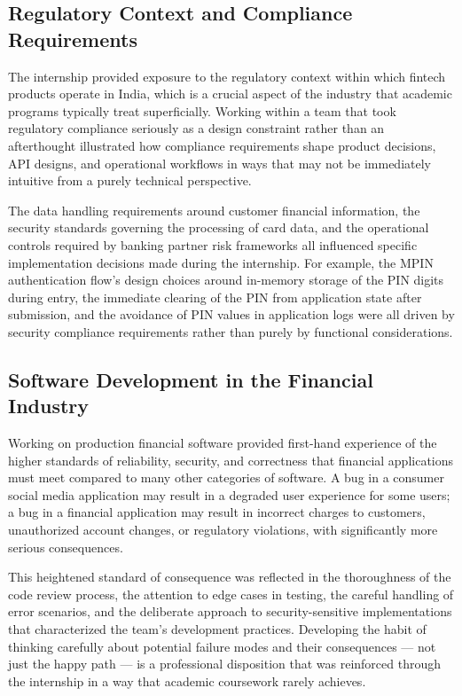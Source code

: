 \subsection{Regulatory Context and Compliance Requirements}

The internship provided exposure to the regulatory context within which fintech products operate in India, which is a crucial aspect of the industry that academic programs typically treat superficially. Working within a team that took regulatory compliance seriously as a design constraint rather than an afterthought illustrated how compliance requirements shape product decisions, API designs, and operational workflows in ways that may not be immediately intuitive from a purely technical perspective.

The data handling requirements around customer financial information, the security standards governing the processing of card data, and the operational controls required by banking partner risk frameworks all influenced specific implementation decisions made during the internship. For example, the MPIN authentication flow's design choices around in-memory storage of the PIN digits during entry, the immediate clearing of the PIN from application state after submission, and the avoidance of PIN values in application logs were all driven by security compliance requirements rather than purely by functional considerations.

\subsection{Software Development in the Financial Industry}

Working on production financial software provided first-hand experience of the higher standards of reliability, security, and correctness that financial applications must meet compared to many other categories of software. A bug in a consumer social media application may result in a degraded user experience for some users; a bug in a financial application may result in incorrect charges to customers, unauthorized account changes, or regulatory violations, with significantly more serious consequences.

This heightened standard of consequence was reflected in the thoroughness of the code review process, the attention to edge cases in testing, the careful handling of error scenarios, and the deliberate approach to security-sensitive implementations that characterized the team's development practices. Developing the habit of thinking carefully about potential failure modes and their consequences — not just the happy path — is a professional disposition that was reinforced through the internship in a way that academic coursework rarely achieves.

